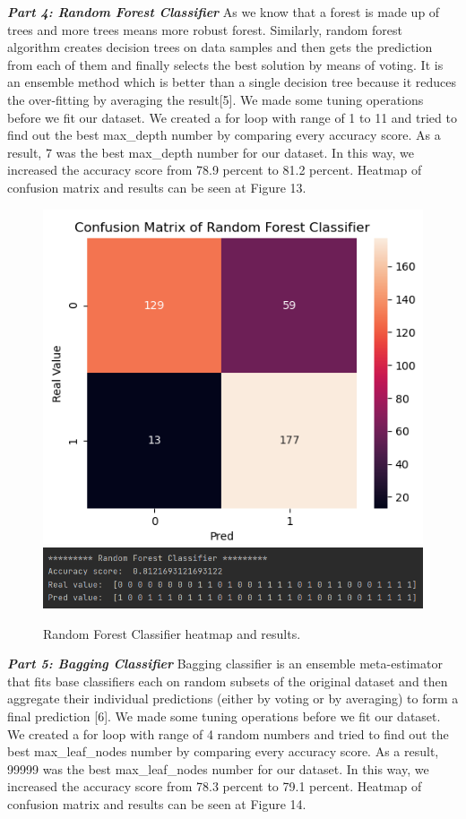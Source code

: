 \documentclass[onecolumn]{article}
\begin{document}
\textbf{\emph{Part 4: Random Forest Classifier}}\bigbreak
As we know that a forest is made up of trees and more trees means more robust forest. Similarly, random forest algorithm creates decision trees on data samples and then gets the prediction from each of them and finally selects the best solution by means of voting. It is an ensemble method which is better than a single decision tree because it reduces the over-fitting by averaging the result[5]. We made some tuning operations before we fit our dataset. We created a for loop with range of 1 to 11 and tried to find out the best max\_depth number by comparing every accuracy score. As a result, 7 was the best max\_depth number for our dataset. In this way, we increased the accuracy score from 78.9 percent to 81.2 percent. Heatmap of confusion matrix and results can be seen at Figure 13. \bigbreak
\bigbreak
\bigbreak
\bigbreak
\bigbreak
\bigbreak
\bigbreak
\bigbreak
\bigbreak
\bigbreak
\bigbreak

\begin{figure}[h]
\centering
{\centering
    \includegraphics[width=.49\linewidth]{fig/fig_rfc2.png}
        \label{figure17}}
{\centering
    \includegraphics[width=.49\linewidth]{fig/fig_rfc1.png}
        \label{figure18}}
\caption{\label{Random Forest Classifier}Random Forest Classifier heatmap and results.}
\end{figure}

\textbf{\emph{Part 5: Bagging Classifier}}\bigbreak
Bagging classifier is an ensemble meta-estimator that fits base classifiers each on random subsets of the original dataset and then aggregate their individual predictions (either by voting or by averaging) to form a final prediction [6]. We made some tuning operations before we fit our dataset. We created a for loop with range of 4 random numbers and tried to find out the best max\_leaf\_nodes number by comparing every accuracy score. As a result, 99999 was the best max\_leaf\_nodes number for our dataset. In this way, we increased the accuracy score from 78.3 percent to 79.1 percent. Heatmap of confusion matrix and results can be seen at Figure 14.\bigbreak
\end{document}
